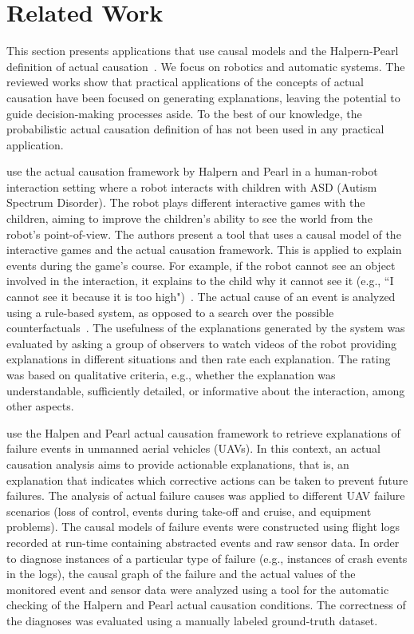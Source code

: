 \section{Related Work}
\label{sec:related_work}
	This section presents applications that use causal models and the Halpern-Pearl definition of actual causation~\citep{Halpern2005}. We focus on robotics and automatic systems. The reviewed works show that practical applications of the concepts of actual causation have been focused on generating explanations, leaving the potential to guide decision-making processes aside. To the best of our knowledge, the probabilistic actual causation definition of \citet{FentonGlynn2017,FentonGlynn2021} has not been used in any practical application. 
	
	\citet{Araujo2022} use the actual causation framework by Halpern and Pearl in a human-robot interaction setting where a robot interacts with children with ASD (Autism Spectrum Disorder). The robot plays different interactive games with the children, aiming to improve the children's ability to see the world from the robot's point-of-view. The authors present a tool that uses a causal model of the interactive games and the actual causation framework. This is applied to explain events during the game's course. For example, if the robot cannot see an object involved in the interaction, it explains to the child why it cannot see it (e.g., ``I cannot see it because it is too high")~\citep{Araujo2022}. The actual cause of an event is analyzed using a rule-based system, as opposed to a search over the possible counterfactuals~\citep{Araujo2022}. The usefulness of the explanations generated by the system was evaluated by asking a group of observers to watch videos of the robot providing explanations in different situations and then rate each explanation. The rating was based on qualitative criteria, e.g., whether the explanation was understandable, sufficiently detailed, or informative about the interaction, among other aspects. 
	
	\citet{Zibaei2024} use the Halpen and Pearl actual causation framework to retrieve explanations of failure events in unmanned aerial vehicles (UAVs). In this context, an actual causation analysis aims to provide actionable explanations, that is, an explanation that indicates which corrective actions can be taken to prevent future failures. The analysis of actual failure causes was applied to different UAV failure scenarios (loss of control, events during take-off and cruise, and equipment problems). The causal models of failure events were constructed using flight logs recorded at run-time containing abstracted events and raw sensor data. In order to diagnose instances of a particular type of failure (e.g., instances of crash events in the logs), the causal graph of the failure and the actual values of the monitored event and sensor data were analyzed using a tool for the automatic checking of the Halpern and Pearl actual causation conditions. The correctness of the diagnoses was evaluated using a manually labeled ground-truth dataset.
	
